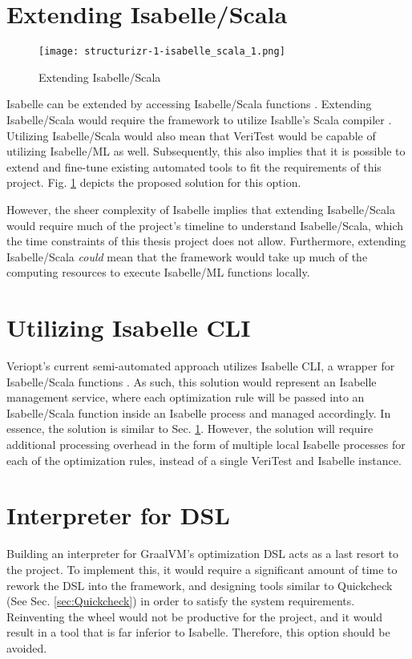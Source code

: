 \section{Extending Isabelle/Scala}
\label{sec:IsabelleScala}

\begin{figure}[!htb]
      \centering
      \texttt{[image: structurizr-1-isabelle\_scala\_1.png]}
      \caption{Extending Isabelle/Scala}
      \label{fig:IsabelleScala}
\end{figure}

Isabelle can be extended by accessing Isabelle/Scala functions \cite[Ch. 5]{isabelleSystem}. Extending Isabelle/Scala would require the framework 
to utilize Isablle's Scala compiler \cite[Sec. 5.1.4]{isabelleSystem}. Utilizing Isabelle/Scala would also mean that VeriTest would be capable of 
utilizing Isabelle/ML as well. Subsequently, this also implies that it is possible to extend and fine-tune existing automated tools to fit the 
requirements of this project. Fig. \ref{fig:IsabelleScala} depicts the proposed solution for this option.

However, the sheer complexity of Isabelle implies that extending Isabelle/Scala would require much of the 
project's timeline to understand Isabelle/Scala, which the time constraints of this thesis project does not allow. 
Furthermore, extending Isabelle/Scala \emph{could} mean that the framework would take up much of the computing resources to execute 
Isabelle/ML functions locally.

\section{Utilizing Isabelle CLI}
\label{sec:IsabelleCLI}

Veriopt's current semi-automated approach \cite[Sec. 5.1]{Term_Graph_Optimizations} utilizes Isabelle CLI, a wrapper for Isabelle/Scala functions 
\cite{IsabelleHOL}. As such, this solution would represent an Isabelle management service, where each optimization rule will be passed into an 
Isabelle/Scala function inside an Isabelle process and managed accordingly. In essence, the solution is similar to Sec. \ref{sec:IsabelleScala}. 
However, the solution will require additional processing overhead in the form of multiple local Isabelle processes for each of the optimization rules, 
instead of a single VeriTest and Isabelle instance.

\section{Interpreter for DSL}
\label{sec:DSLInterpreter}

Building an interpreter for GraalVM's optimization DSL acts as a last resort to the project. To implement this, it would require a significant 
amount of time to rework the DSL into the framework, and designing tools similar to Quickcheck (See Sec. \ref{sec:Quickcheck}) in order to satisfy the 
system requirements. Reinventing the wheel would not be productive for the project, and it would result in a tool that is far inferior to Isabelle.
Therefore, this option should be avoided.
